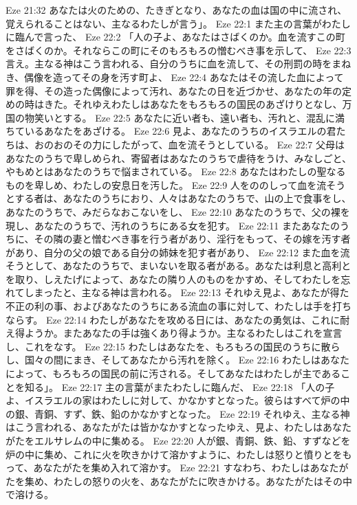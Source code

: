 Eze 21:32  あなたは火のための、たきぎとなり、あなたの血は国の中に流され、覚えられることはない、主なるわたしが言う」。
Eze 22:1  また主の言葉がわたしに臨んで言った、
Eze 22:2  「人の子よ、あなたはさばくのか。血を流すこの町をさばくのか。それならこの町にそのもろもろの憎むべき事を示して、
Eze 22:3  言え。主なる神はこう言われる、自分のうちに血を流して、その刑罰の時をまねき、偶像を造ってその身を汚す町よ、
Eze 22:4  あなたはその流した血によって罪を得、その造った偶像によって汚れ、あなたの日を近づかせ、あなたの年の定めの時はきた。それゆえわたしはあなたをもろもろの国民のあざけりとなし、万国の物笑いとする。
Eze 22:5  あなたに近い者も、遠い者も、汚れと、混乱に満ちているあなたをあざける。
Eze 22:6  見よ、あなたのうちのイスラエルの君たちは、おのおのその力にしたがって、血を流そうとしている。
Eze 22:7  父母はあなたのうちで卑しめられ、寄留者はあなたのうちで虐待をうけ、みなしごと、やもめとはあなたのうちで悩まされている。
Eze 22:8  あなたはわたしの聖なるものを卑しめ、わたしの安息日を汚した。
Eze 22:9  人をののしって血を流そうとする者は、あなたのうちにおり、人々はあなたのうちで、山の上で食事をし、あなたのうちで、みだらなおこないをし、
Eze 22:10  あなたのうちで、父の裸を現し、あなたのうちで、汚れのうちにある女を犯す。
Eze 22:11  またあなたのうちに、その隣の妻と憎むべき事を行う者があり、淫行をもって、その嫁を汚す者があり、自分の父の娘である自分の姉妹を犯す者があり、
Eze 22:12  また血を流そうとして、あなたのうちで、まいないを取る者がある。あなたは利息と高利とを取り、しえたげによって、あなたの隣り人のものをかすめ、そしてわたしを忘れてしまったと、主なる神は言われる。
Eze 22:13  それゆえ見よ、あなたが得た不正の利の事、およびあなたのうちにある流血の事に対して、わたしは手を打ちならす。
Eze 22:14  わたしがあなたを攻める日には、あなたの勇気は、これに耐え得ようか。またあなたの手は強くあり得ようか。主なるわたしはこれを宣言し、これをなす。
Eze 22:15  わたしはあなたを、もろもろの国民のうちに散らし、国々の間にまき、そしてあなたから汚れを除く。
Eze 22:16  わたしはあなたによって、もろもろの国民の前に汚される。そしてあなたはわたしが主であることを知る」。
Eze 22:17  主の言葉がまたわたしに臨んだ、
Eze 22:18  「人の子よ、イスラエルの家はわたしに対して、かなかすとなった。彼らはすべて炉の中の銀、青銅、すず、鉄、鉛のかなかすとなった。
Eze 22:19  それゆえ、主なる神はこう言われる、あなたがたは皆かなかすとなったゆえ、見よ、わたしはあなたがたをエルサレムの中に集める。
Eze 22:20  人が銀、青銅、鉄、鉛、すずなどを炉の中に集め、これに火を吹きかけて溶かすように、わたしは怒りと憤りとをもって、あなたがたを集め入れて溶かす。
Eze 22:21  すなわち、わたしはあなたがたを集め、わたしの怒りの火を、あなたがたに吹きかける。あなたがたはその中で溶ける。
